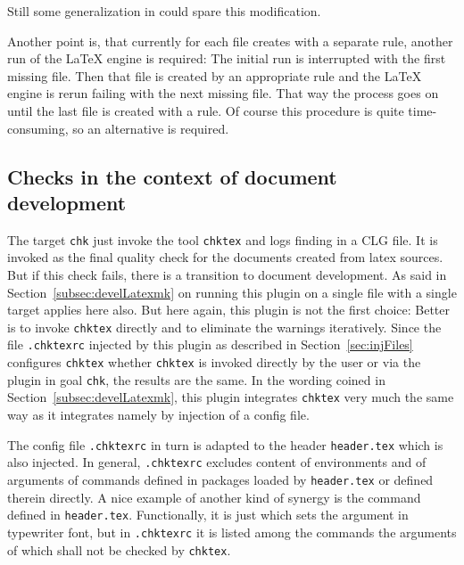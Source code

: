 Still some generalization in  could spare this modification. 

Another point is, that currently for each file 
 creates with a separate rule, 
another run of the \LaTeX{} engine is required: 
The initial run is interrupted with the first missing file. 
Then that file is created by an appropriate rule and the \LaTeX{} engine is rerun 
failing with the next missing file. 
That way the process goes on until the last file is created with a rule. 
Of course this procedure is quite time-consuming, so an alternative is required. 


\subsection{Checks in the context of document development}\label{subsec:develCheck}

The target \texttt{chk} just invoke the tool \texttt{chktex} and logs finding in a CLG file. 
It is invoked as the final quality check for the documents created from latex sources. 
But if this check fails, there is a transition to document development. 
As said in Section~\ref{subsec:develLatexmk} on running this plugin on a single file with a single target 
applies here also. 
But here again, this plugin is not the first choice: Better is to invoke \texttt{chktex} directly 
and to eliminate the warnings iteratively. 
Since the file \texttt{.chktexrc} injected by this plugin as described in Section~\ref{sec:injFiles} 
configures \texttt{chktex} whether \texttt{chktex} is invoked directly by the user 
or via the plugin in goal \texttt{chk}, the results are the same. 
In the wording coined in Section~\ref{subsec:develLatexmk}, 
this plugin integrates \texttt{chktex} very much the same way as it integrates  
namely by injection of a config file. 

The config file \texttt{.chktexrc} in turn is adapted to the header \texttt{header.tex} 
which is also injected. 
In general, \texttt{.chktexrc} excludes content of environments 
and of arguments of commands defined in packages loaded by \texttt{header.tex} 
or defined therein directly. 
A nice example of another kind of synergy is the command  
defined in \texttt{header.tex}. 
Functionally, it is just  which sets the argument in typewriter font, 
but in \texttt{.chktexrc} it is listed among the commands 
the arguments of which shall not be checked by \texttt{chktex}. 
\medskip


